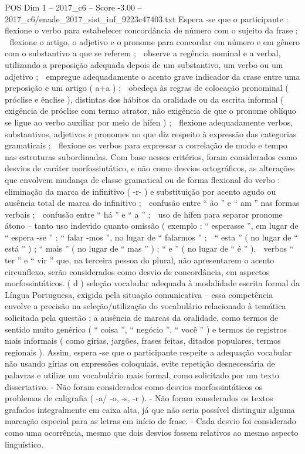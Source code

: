 \begin{textsample}{POS Dim 1 – 2017\_c6 – Score -3.00 – 2017\_c6/enade\_2017\_sist\_inf\_9223c47403.txt}
Espera -se que o participante :  flexione o verbo para estabelecer concordância de número com o sujeito da frase ;  flexione o artigo, o adjetivo e o pronome para concordar em número e em gênero com o substantivo a que se referem ;  observe a regência nominal e a verbal, utilizando a preposição adequada depois de um substantivo, um verbo ou um adjetivo ;  empregue adequadamente o acento grave indicador da crase entre uma preposição e um artigo ( a+a ) ;  obedeça às regras de colocação pronominal ( próclise e ênclise ), distintas dos hábitos da oralidade ou da escrita informal ( exigência de próclise com termo atrator, não exigência de que o pronome oblíquo se ligue ao verbo auxiliar por meio de hífen ) ;  flexione adequadamente verbos, substantivos, adjetivos e pronomes no que diz respeito à expressão das categorias gramaticais ;  flexione os verbos para expressar a correlação de modo e tempo nas estruturas subordinadas.
Com base nesses critérios, foram considerados como desvios de caráter morfossintático, e não como desvios ortográficos, as alterações que envolvem mudança de classe gramatical ou de forma flexional do verbo :  eliminação da marca de infinitivo ( -r- ) e substituição por acento agudo ou ausência total de marca do infinitivo ;  confusão entre “ ão ” e “ am ” nas formas verbais ;  confusão entre “ há ” e “ a ” ;  uso de hífen para separar pronome átono – tanto uso indevido quanto omissão ( exemplo : “ esperasse ”, em lugar de “ espera -se ” ; “ falar -mos ”, no lugar de “ falarmos ” ;  “ esta ” ( no lugar de “ está ” ) ; “ mais ” ( no lugar de “ mas ” ) ; “ e ” ( no lugar de “ é ” ).  verbos “ ter ” e “ vir ” que, na terceira pessoa do plural, não apresentarem o acento circunflexo, serão considerados como desvio de concordância, em aspectos morfossintáticos. ( d ) seleção vocabular adequada à modalidade escrita formal da Língua Portuguesa, exigida pela situação comunicativa – essa competência envolve a precisão na seleção/utilização do vocabulário relacionado à temática solicitada pela questão ; a ausência de marcas da oralidade, como termos de sentido muito genérico ( “ coisa ”, “ negócio ”, “ você ” ) e termos de registros mais informais ( como gírias, jargões, frases feitas, ditados populares, termos regionais ).
Assim, espera -se que o participante respeite a adequação vocabular não usando gírias ou expressões coloquiais, evite repetição desnecessária de palavras e utilize um vocabulário mais formal, como solicitado por um texto dissertativo. - Não foram considerados como desvios morfossintáticos os problemas de caligrafia ( -a/ -o, -s, -r ). - Não foram consderados os textos grafados integralmente em caixa alta, já que não seria possível distinguir alguma marcação especial para as letras em início de frase. - Cada desvio foi considerado como uma ocorrência, mesmo que dois desvios fossem relativos ao mesmo aspecto linguístico.

\end{textsample}
